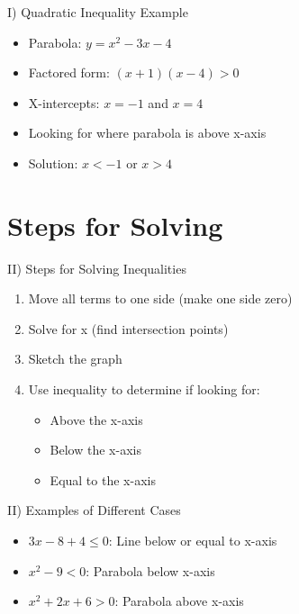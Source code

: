 \documentclass[aspectratio=169]{beamer}
\begin{document}
\begin{frame}{I) Quadratic Inequality Example}
    \begin{tcolorbox}[colback=lightgray,colframe=primary,title=Example: $x^2-3x-4>0$]
        \footnotesize
        \begin{itemize}
            \item Parabola: $y=x^2-3x-4$
            \item Factored form: $(x+1)(x-4)>0$
            \item X-intercepts: $x=-1$ and $x=4$
            \item Looking for where parabola is above x-axis
            \item Solution: $x<-1$ or $x>4$
        \end{itemize}
    \end{tcolorbox}
\end{frame}

\section{Steps for Solving}

\begin{frame}{II) Steps for Solving Inequalities}
    \begin{tcolorbox}[colback=lightgray,colframe=primary,title=Steps]
        \footnotesize
        \begin{enumerate}
            \item Move all terms to one side (make one side zero)
            \item Solve for x (find intersection points)
            \item Sketch the graph
            \item Use inequality to determine if looking for:
            \begin{itemize}
                \item Above the x-axis
                \item Below the x-axis
                \item Equal to the x-axis
            \end{itemize}
        \end{enumerate}
    \end{tcolorbox}
\end{frame}

\begin{frame}{II) Examples of Different Cases}
    \begin{tcolorbox}[colback=lightgray,colframe=primary,title=Examples]
        \footnotesize
        \begin{itemize}
            \item $3x-8+4\leq0$: Line below or equal to x-axis
            \item $x^2-9<0$: Parabola below x-axis
            \item $x^2+2x+6>0$: Parabola above x-axis
        \end{itemize}
    \end{tcolorbox}
\end{frame}
\end{document}
